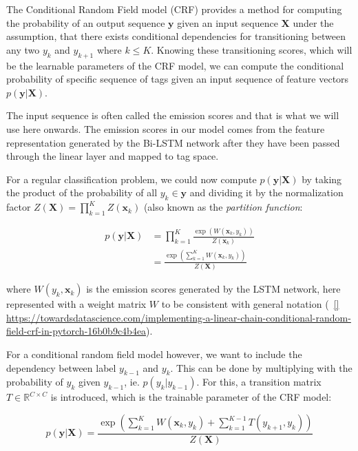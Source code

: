 The Conditional Random Field model (CRF) provides a method for computing the
probability of an output sequence $\bm{y}$ given an input sequence $\bm{X}$
under the assumption, that there exists conditional dependencies for
transitioning between any two $y_{k}$ and $y_{k+1}$ where $k \leq K$. Knowing these
transitioning scores, which will be the learnable parameters of the CRF model,
we can compute the conditional probability of specific sequence of tags given an
input sequence of feature vectors $p(\bm{y}|\bm{X})$.

The input sequence is often called the emission scores and that is what we will
use here onwards. The emission scores in our model comes from the feature
representation generated by the Bi-LSTM network after they have been passed
through the linear layer and mapped to tag space. 

For a regular classification problem, we could now compute $p(\bm{y}|\bm{X})$ by
taking the product of the probability of all $y_{k} \in \bm{y}$ and dividing it
by the normalization factor $Z(\bm{X}) = \prod_{k=1}^{K} Z(\bm{x}_{k})$ (also
known as the \textit{partition function}:

\begin{align*}
p(\bm{y}|\bm{X}) & = \prod_{k=1}^{K} \frac{\exp( W(\bm{x}_{k}, y_{k}) )} 
                                            {Z(\bm{x}_{k})} \\
                 & = \frac{\exp( \sum_{k=1}^{K} W(\bm{x}_k, y_{k}) )}
                                            {Z(\bm{X})}
\end{align*}

where $W(y_{k}, \bm{x}_{k})$ is the emission scores generated by the LSTM
network, here represented with a weight matrix $W$ to be consistent with general
notation (~\ref{}
\url{https://towardsdatascience.com/implementing-a-linear-chain-conditional-random-field-crf-in-pytorch-16b0b9c4b4ea}).

For a conditional random field model however, we want to include the
dependency between label $y_{k-1}$ and $y_{k}$. This can be done by multiplying
with the probability of $y_{k}$ given $y_{k-1}$, ie. $p(y_{k}|y_{k-1})$. For
this, a transition matrix $T \in \mathbb{R}^{C \times C}$ is introduced, which 
is the trainable parameter of the CRF model:

\begin{equation*}
p(\bm{y}|\bm{X}) = \frac{\exp( \sum_{k=1}^{K} W(\bm{x}_k, y_{k}) +
                    \sum_{k=1}^{K-1} T(y_{k+1}, y_{k}) )}{Z(\bm{X})}
\end{equation*}

